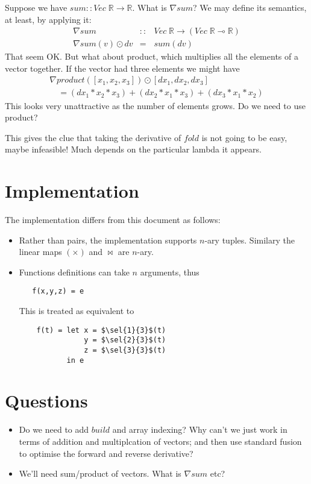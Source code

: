 \documentclass[sigplan,review]{acmart}
\renewcommand{\to}{\rightarrow}    %
\newcommand{\linto}{\multimap}     %
\newcommand{\gradf}[1]{\nabla\! \mathit{#1}}  %
\newcommand{\sel}[2]{\pi_{#1,#2}}
\newcommand{\buildfun}{\mathit{build}}
\renewcommand{\vector}[1]{\mathit{Vec}\;#1}
\newcommand{\real}{\mathbb{R}}       %
\newcommand{\lmapply}{\odot}   %
\newcommand{\lmcomp}{\,\circ\,}   %
\newcommand{\lmpair}{\times}         %
\newcommand{\lmjoin}{\bowtie}        %
\begin{document}
Suppose we have $sum :: \vector{\real} \to \real$.  What is $\gradf{sum}$?
We may define its semantics, at least, by applying it:
$$
\begin{array}{rcl}
  \gradf{sum} & :: & \vector{\real} \to (\vector{\real} \linto \real) \\
  \gradf{sum}(v) \lmapply dv & = & sum(dv)
\end{array}
$$
That seem OK.  But what about product, which multiplies all the elements
of a vector together. If the vector had three elements we might have
$$
\begin{array}{l}
  \gradf{product}([x_1,x_2,x_3]) \lmapply [dx_1, dx_2, dx_3] \\
  \quad = (dx_1 * x_2 * x_3) + (dx_2 * x_1 * x_3) + (dx_3 * x_1 * x_2)
\end{array}
$$
This looks very unattractive as the number of elements grows.  Do we need
to use product?

This gives the clue that taking the derivative of $\mathit{fold}$ is
not going to be easy, maybe infeasible!  Much depends on the
particular lambda it appears.

\section{Implementation}

The implementation differs from this document as follows:
\begin{itemize}
\item Rather than pairs, the implementation supports $n$-ary tuples.
  Similary the linear maps $(\lmpair)$ and $\lmjoin$ are $n$-ary.
\item Functions definitions can take $n$ arguments, thus
  \begin{lstlisting}
   f(x,y,z) = e
  \end{lstlisting}
  This is treated as equivalent to
  \begin{lstlisting}
    f(t) = let x = $\sel{1}{3}$(t)
               y = $\sel{2}{3}$(t)
               z = $\sel{3}{3}$(t)
           in e
  \end{lstlisting}
\end{itemize}

\section{Questions}

\begin{itemize}
\item Do we need to add $\buildfun$ and array indexing?  Why can't we just work in terms of
  addition and multiplcation of vectors; and then use standard fusion to
  optimise the forward and reverse derivative?

\item We'll need sum/product of vectors.  What is $\gradf{sum}$ etc?

\end{itemize}  
\end{document}
